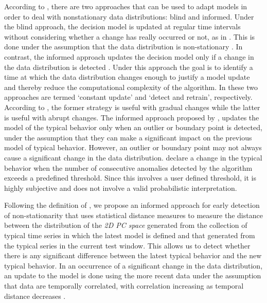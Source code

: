 \documentclass[12pt]{article}
\begin{document}
According to \citet{gama2013evaluating}, there are two approaches that
can be used to adapt models in order to deal with nonstationary data
distributions: blind and informed. Under the blind approach, the
decision model is updated at regular time intervals without considering
whether a change has really occurred or not, as in
\citet{zhang2010ensuring}. This is done under the assumption that the
data distribution is non-stationary \citep{o2014anomaly}. In contrast,
the informed approach updates the decision model only if a change in the
data distribution is detected \citep{faria2016novelty}. Under this
approach the goal is to identify a time at which the data distribution
changes enough to justify a model update and thereby reduce the
computational complexity of the algorithm. In \citet{o2014anomaly} these
two approaches are termed `constant update' and `detect and retrain',
respectively. According to \citet{rodriguez2008combining}, the former
strategy is useful with gradual changes while the latter is useful with
abrupt changes. The informed approach proposed by
\citet{zhang2010ensuring}, updates the model of the typical behavior
only when an outlier or boundary point is detected, under the assumption
that they can make a significant impact on the previous model of typical
behavior. However, an outlier or boundary point may not always cause a
significant change in the data distribution.
\citet{moshtaghi2014streaming} declare a change in the typical behavior
when the number of consecutive anomalies detected by the algorithm
exceeds a predefined threshold. Since this involves a user defined
threshold, it is highly subjective and does not involve a valid
probabilistic interpretation.

Following the definition of \citet{dries2009adaptive}, we propose an
informed approach for early detection of non-stationarity that uses
statistical distance measures to measure the distance between the
distribution of the \emph{2D PC space} generated from the collection of
typical time series in which the latest model is defined and that
generated from the typical series in the current test window. This
allows us to detect whether there is any significant difference between
the latest typical behavior and the new typical behavior. In an
occurrence of a significant change in the data distribution, an update
to the model is done using the more recent data under the assumption
that data are temporally correlated, with correlation increasing as
temporal distance decreases \citep{o2014anomaly}.

\begin{algo} {\label{alg:algorithm-concept}}
\end{algo}
\vspace{-0.5em}
\end{document}
